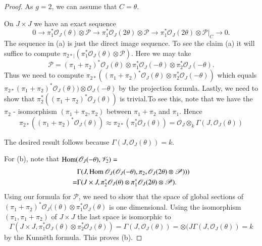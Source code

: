 \begin{proof}
As $g=2$, we can assume that $C=\theta$.

On $J\times J$ we have an exact sequence
$$
0\to \pi^{*}_{1}\mathscr{O}_{J}(\theta)\otimes \mathscr{P}\to \pi^{*}_{1}\mathscr{O}_{J}(2\theta)\otimes \mathscr{P}\to \pi^{*}_{1}\mathscr{O}_{J}(2\theta)\otimes \mathscr{P}|_{C}\to 0.
$$
The sequence in (a) is just the direct image sequence. To see the
claim (a) it will suffice to compute
$\pi_{2*|}(\pi^{*}_{1}\mathscr{O}_{J}(\theta)\otimes \mathscr{P})$. Here
we may take
$$
\mathscr{P}=(\pi_{1}+\pi_{2})^{*}\mathscr{O}_{J}(\theta)\otimes \pi^{*}_{1}\mathscr{O}_{J}(-\theta)\otimes \pi^{*}_{2}\mathscr{O}_{J}(-\theta). 
$$
Thus we need to compute
$\pi_{2*}((\pi_{1}+\pi_{2})^{*}\mathscr{O}_{J}(\theta)\otimes \pi^{*}_{2}\mathscr{O}_{J}(-\theta))$
which equals
$\pi_{2*}(\pi_{1}+\pi_{2})^{*}\mathscr{O}_{J}(\theta))\otimes \mathscr{O}_{J}(-\theta)$
by the projection formula. Lastly, we need to show that
$\pi_{2}^{*}((\pi_{1}+\pi_{2})^{*}\mathscr{O}_{J}(\theta))$ is
trivial.\pageoriginale To see this, note that we have the $\pi_{2}$ -
isomorphism $(\pi_{1}+\pi_{2},\pi_{2})$ between $\pi_{1}+\pi_{2}$ and
$\pi_{1}$. Hence
$$
\pi_{2*}((\pi_{1}+\pi_{2})^{*}\mathscr{O}_{J}(\theta))\approx \pi_{2*}(\pi^{*}_{1}\mathscr{O}_{J}(\theta))=\mathscr{O}_{J}\otimes_{k}\Gamma(J,\mathscr{O}_{J}(\theta))
$$

The desired result follows because
$\Gamma(J,\mathscr{O}_{J}(\theta))=k$. 

For (b), note that $\operatorname{Hom}(\mathscr{O}_{J}(-\theta),\mathscr{V}_{2})=$
\begin{align*}
& \Gamma(J,\operatorname{Hom}\mathscr{O}_{J}(\mathscr{O}_{J}(-\theta),\pi_{2*}\mathscr{O}_{J}(2\theta)\otimes \mathscr{P})))\\
= & \Gamma(J\times
J,\pi^{*}_{2}\mathscr{O}_{J}(\theta)\otimes \pi^{*}_{1}\mathscr{O}_{J}(2\theta)\otimes \mathscr{P}).
\end{align*}
Using our formula for $\mathscr{P}$, we need to show that the space of
global sections of
$(\pi_{1}+\pi_{2})^{*}\mathscr{O}_{J}((\theta)\otimes \pi^{*}_{1}\mathscr{O}_{J}(\theta)$
is one dimensional. Using the isomorphism $(\pi_{1},\pi_{1}+\pi_{2})$
of $J\times J$ the last space is isomorphic to
$$
\Gamma(J\times
J,\pi^{*}_{1}\mathscr{O}_{J}(\theta)\otimes \pi^{*}_{2}\mathscr{O}_{J}(\theta))=\Gamma(J,\mathscr{O}_{J}(\theta))=\otimes
(J\Gamma(J,\mathscr{O}_{J}(\theta))=k 
$$
by the Kunn\"eth formula. This proves (b).
\end{proof}


